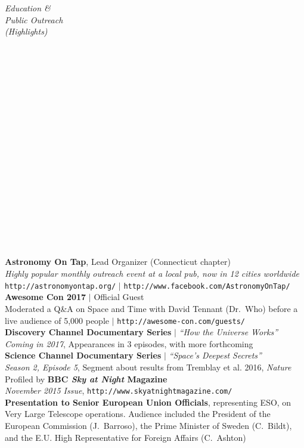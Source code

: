 \documentclass[11pt]{article}
\begin{document}
\vspace{4mm}



\hspace{2.5mm} \parbox{1.5in}{\textit{Education \& \\ Public Outreach \\ (Highlights) \\\\\\\\\\\\\\\\\\\\\\\\\\\\\\\\\\\\\\}} \parbox{5.15in}{
\textbf{Astronomy On Tap}, Lead Organizer (Connecticut chapter) \\
\textit{Highly popular monthly outreach event at a local pub, now in 12 cities worldwide} \\
{\footnotesize \texttt{http://astronomyontap.org/}} $|$ {\footnotesize \texttt{http://www.facebook.com/AstronomyOnTap/}} \\


\textbf{Awesome Con 2017} $|$ Official Guest \\
Moderated a Q\&A on Space and Time with David Tennant (Dr.~Who) before a live audience of 5,000 people $|$ \texttt{http://awesome-con.com/guests/}  \\

\textbf{Discovery Channel Documentary Series} $|$ \textit{``How the Universe Works''} \\ \textit{Coming in 2017}, Appearances in 3 episodes, with more forthcoming\\

\textbf{Science Channel Documentary Series} $|$ \textit{``Space's Deepest Secrets''} \\ \textit{Season 2, Episode 5},
Segment about results from Tremblay et al. 2016, \textit{Nature}\\

Profiled by \textbf{BBC \textit{Sky at Night} Magazine} \\ \textit{November 2015 Issue},
{\footnotesize \texttt{http://www.skyatnightmagazine.com/}}\\

\textbf{Presentation to Senior European Union Officials}, representing ESO, on Very Large Telescope operations. Audience included
the President of the European Commission (J.~Barroso), the Prime Minister of Sweden (C.~Bildt), and the
E.U. High Representative for Foreign Affairs (C.~Ashton) \\ }
\end{document}

